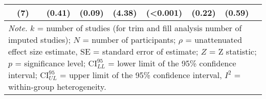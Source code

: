 \begin{table}[ht]
\begin{tabular}{lccccccccc}
   & (7) &  & (0.41) & (0.09) & (4.38) & (<0.001) & (0.22) & (0.59) &  \\ 
   \hline 
 \multicolumn{10}{p{0.95\textwidth}}{\scriptsize{\textit{Note.} $k$ = number of studies (for trim and fill analysis number of imputed studies); $N$ = number of participants; $\rho$ = unattenuated effect size estimate, SE = standard error of estimate; $Z$ = Z statistic; $p$ = significance level; $\textrm{CI}^{95}_{LL}$ = lower limit of the 95\% confidence interval; $\textrm{CI}^{95}_{UL}$ = upper limit of the 95\% confidence interval, $I^2$ = within-group heterogeneity.}} 
\end{tabular}
\endgroup
\end{table}
